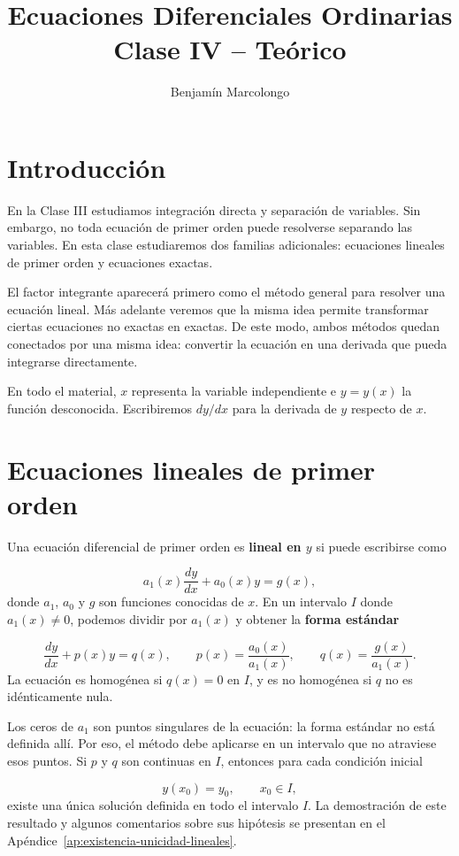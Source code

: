 \documentclass[12pt,a4paper]{article}
\title{Ecuaciones Diferenciales Ordinarias\\Clase IV -- Teórico}
\author{Benjamín Marcolongo}
\date{}
\begin{document}
	\maketitle

	\section*{Introducción}

	En la Clase III estudiamos integración directa y separación de variables. Sin embargo, no toda ecuación de primer orden puede resolverse separando las variables. En esta clase estudiaremos dos familias adicionales: ecuaciones lineales de primer orden y ecuaciones exactas.

	El factor integrante aparecerá primero como el método general para resolver una ecuación lineal. Más adelante veremos que la misma idea permite transformar ciertas ecuaciones no exactas en exactas. De este modo, ambos métodos quedan conectados por una misma idea: convertir la ecuación en una derivada que pueda integrarse directamente.

	En todo el material, \(x\) representa la variable independiente e \(y=y(x)\) la función desconocida. Escribiremos \(dy/dx\) para la derivada de \(y\) respecto de \(x\).

	\clearpage
	\section{Ecuaciones lineales de primer orden}

	Una ecuación diferencial de primer orden es \textbf{lineal en \(y\)} si puede escribirse como

	\[
	a_1(x)\frac{dy}{dx}+a_0(x)y=g(x),
	\]
	donde \(a_1\), \(a_0\) y \(g\) son funciones conocidas de \(x\). En un intervalo \(I\) donde \(a_1(x)\neq0\), podemos dividir por \(a_1(x)\) y obtener la \textbf{forma estándar}

	\[
	\boxed{
	\frac{dy}{dx}+p(x)y=q(x),
	}
	\qquad
	p(x)=\frac{a_0(x)}{a_1(x)},
	\qquad
	q(x)=\frac{g(x)}{a_1(x)}.
	\]
	La ecuación es homogénea si \(q(x)=0\) en \(I\), y es no homogénea si \(q\) no es idénticamente nula.

	Los ceros de \(a_1\) son puntos singulares de la ecuación: la forma estándar no está definida allí. Por eso, el método debe aplicarse en un intervalo que no atraviese esos puntos. Si \(p\) y \(q\) son continuas en \(I\), entonces para cada condición inicial

	\[
	y(x_0)=y_0,
	\qquad x_0\in I,
	\]
	existe una única solución definida en todo el intervalo \(I\). La demostración de este resultado y algunos comentarios sobre sus hipótesis se presentan en el Apéndice~\ref{ap:existencia-unicidad-lineales}.
\end{document}
